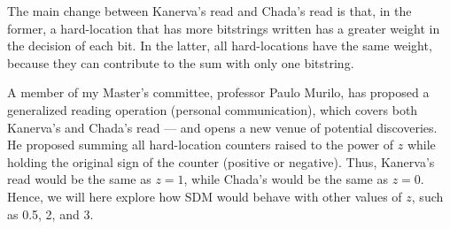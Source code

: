 The main change between Kanerva's read and Chada's read is that, in the former, a hard-location that has more bitstrings written has a greater weight in the decision of each bit. In the latter, all hard-locations have the same weight, because they can contribute to the sum with only one bitstring.

A member of my Master's committee, professor Paulo Murilo, has proposed a generalized reading operation (personal communication), which covers both Kanerva's and Chada's read --- and opens a new venue of potential discoveries. He proposed summing all hard-location counters raised to the power of $z$ while holding the original sign of the counter (positive or negative). Thus, Kanerva's read would be the same as $z=1$, while Chada's would be the same as $z=0$. Hence, we will here explore how SDM would behave with other values of $z$, such as 0.5, 2, and 3.

